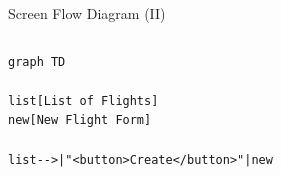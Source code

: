 \documentclass[aspectratio=43,handout,bigger]{beamer}
\begin{document}
\begin{frame}[fragile]{Screen Flow Diagram (II)}
  \begin{columns}
    \begin{column}{.5\textwidth}
\begin{verbatim}
graph TD

list[List of Flights]
new[New Flight Form]

list-->|"<button>Create</button>"|new
\end{verbatim}
\end{column}
\begin{column}{.5\textwidth}
\end{column}
\end{columns}
\end{frame}

\end{document}
